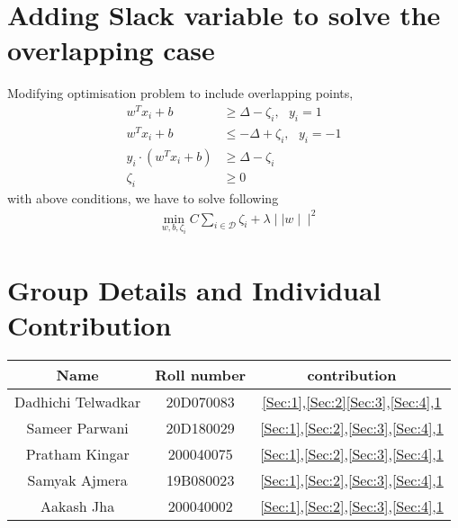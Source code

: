 \documentclass[11pt, twosides]{article}
\begin{document}
\section{Adding Slack variable to solve the overlapping case}
\label{Sec:5}
Modifying optimisation problem to include overlapping points,
\begin{align*}
    w^Tx_i + b &\ge \Delta - \zeta_i, \, \, \, \, y_i = 1\\
    w^Tx_i +b &\le -\Delta + \zeta_i,\, \, \, \, y_i = -1\\
        y_i \cdot \left(w^Tx_i + b \right) &\ge \Delta - \zeta_i \\
\zeta_i &\ge 0
\end{align*}
with above conditions, we have to solve following
\begin{align*}
    &\min_{w,b,\zeta_i} C\sum_{i \in \mathcal{D}} \zeta_i
 + \lambda \mid \mid w \mid \mid ^2 
 \end{align*}


\section{Group Details and Individual Contribution}
\begin{table}[H]
    \centering
    \begin{tabular}{|c|c|c|}
     \hline
        Name & Roll number & contribution \\
        \hline
        Dadhichi Telwadkar & 20D070083 & 
        \ref{Sec:1},\ref{Sec:2}\ref{Sec:3},\ref{Sec:4},\ref{Sec:5}\\
         \hline
         Sameer Parwani & 20D180029 &
        \ref{Sec:1},\ref{Sec:2},\ref{Sec:3},\ref{Sec:4},\ref{Sec:5}\\
         \hline
        Pratham Kingar & 200040075 & \ref{Sec:1},\ref{Sec:2},\ref{Sec:3},\ref{Sec:4},\ref{Sec:5}\\
         \hline
        Samyak Ajmera & 19B080023 &
        \ref{Sec:1},\ref{Sec:2},\ref{Sec:3},\ref{Sec:4},\ref{Sec:5}\\
         \hline
        Aakash Jha & 200040002 & \ref{Sec:1},\ref{Sec:2},\ref{Sec:3},\ref{Sec:4},\ref{Sec:5}\\
        
    \hline
    \end{tabular}
    \label{tab:my_label}
\end{table}
\end{document}
